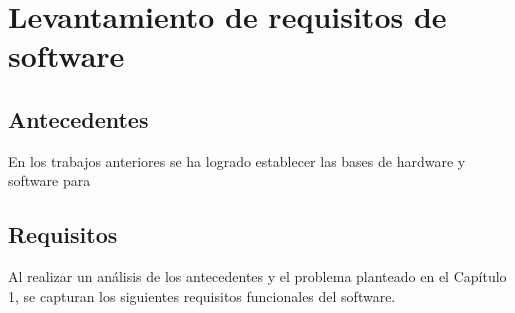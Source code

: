 \section{Levantamiento de requisitos de software}

\subsection{Antecedentes}
En los trabajos anteriores se ha logrado establecer las bases de hardware y software para



\subsection{Requisitos}

Al realizar un análisis de los antecedentes y el problema planteado en el Capítulo 1, se capturan los siguientes requisitos funcionales del software.





